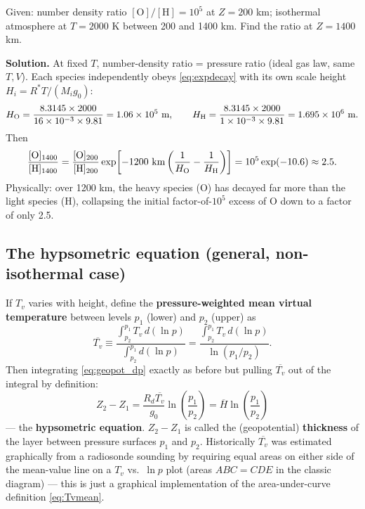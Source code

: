 \documentclass[11pt]{article}
\newcommand{\Rd}{R_d}
\begin{document}
\begin{worked}
Given: number density ratio $[\text{O}]/[\text{H}] = 10^5$ at $Z=200$ km; isothermal atmosphere at $T=2000$ K between 200 and 1400 km. Find the ratio at $Z=1400$ km.

\textbf{Solution.} At fixed $T$, number-density ratio = pressure ratio (ideal gas law, same $T,V$). Each species independently obeys \eqref{eq:expdecay} with its own scale height $H_i = R^*T/(M_i g_0)$:
\[
H_{\rm O} = \frac{8.3145\times2000}{16\times10^{-3}\times9.81} = 1.06\times10^{5}\ \text{m}, \qquad
H_{\rm H} = \frac{8.3145\times2000}{1\times10^{-3}\times9.81} = 1.695\times10^{6}\ \text{m}.
\]
Then
\[
\frac{[\text{O}]_{1400}}{[\text{H}]_{1400}} = \frac{[\text{O}]_{200}}{[\text{H}]_{200}}\exp\!\left[-1200\ \text{km}\left(\frac{1}{H_{\rm O}}-\frac{1}{H_{\rm H}}\right)\right] = 10^5 \exp(-10.6) \approx 2.5.
\]
Physically: over 1200 km, the heavy species (O) has decayed far more than the light species (H), collapsing the initial factor-of-$10^5$ excess of O down to a factor of only 2.5.
\end{worked}

\subsection{The hypsometric equation (general, non-isothermal case)}
\label{sec:hypsometric}

If $T_v$ varies with height, define the \textbf{pressure-weighted mean virtual temperature} between levels $p_1$ (lower) and $p_2$ (upper) as
\begin{equation}
\overline{T_v} \equiv \frac{\displaystyle\int_{p_2}^{p_1} T_v\,d(\ln p)}{\displaystyle\int_{p_2}^{p_1} d(\ln p)} = \frac{\displaystyle\int_{p_2}^{p_1}T_v\,d(\ln p)}{\ln(p_1/p_2)}.
\label{eq:Tvmean}
\end{equation}
Then integrating \eqref{eq:geopot_dp} exactly as before but pulling $\overline{T_v}$ out of the integral by definition:
\begin{equation}
\boxed{Z_2-Z_1 = \frac{\Rd \overline{T_v}}{g_0}\ln\!\left(\frac{p_1}{p_2}\right) = \overline{H}\ln\!\left(\frac{p_1}{p_2}\right)}
\label{eq:hypsometric}
\end{equation}
— the \textbf{hypsometric equation}. $Z_2-Z_1$ is called the (geopotential) \textbf{thickness} of the layer between pressure surfaces $p_1$ and $p_2$. Historically $\overline{T_v}$ was estimated graphically from a radiosonde sounding by requiring equal areas on either side of the mean-value line on a $T_v$ vs.\ $\ln p$ plot (areas $ABC=CDE$ in the classic diagram) — this is just a graphical implementation of the area-under-curve definition \eqref{eq:Tvmean}.
\end{document}

